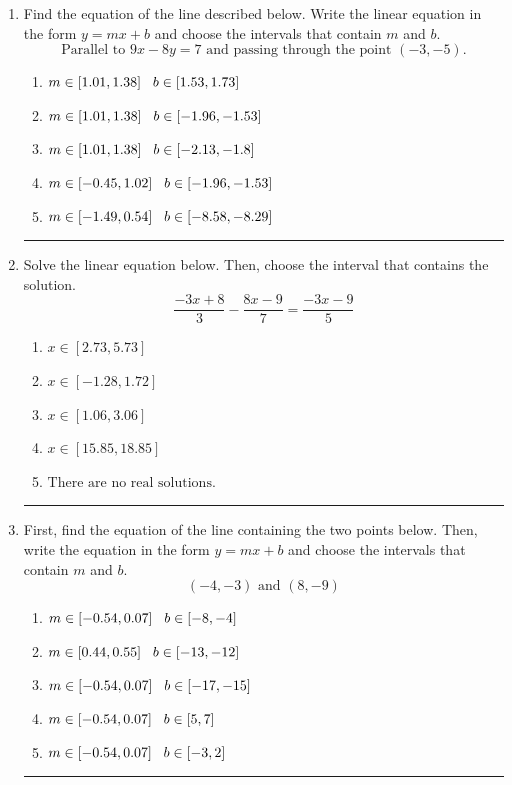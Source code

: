 \documentclass[14pt]{extbook}
\newcommand{\litem}[1]{\item#1\hspace*{-1cm}\rule{\textwidth}{0.4pt}}
\begin{document}
\begin{enumerate}
{\begin{enumerate}[label=\Alph*.]
\end{enumerate} }
\litem{
Find the equation of the line described below. Write the linear equation in the form $ y=mx+b $ and choose the intervals that contain $m$ and $b$.\[ \text{Parallel to } 9 x - 8 y = 7 \text{ and passing through the point } (-3, -5). \]\begin{enumerate}[label=\Alph*.]
\item \( m \in [1.01, 1.38] \hspace*{3mm} b \in [1.53, 1.73] \)
\item \( m \in [1.01, 1.38] \hspace*{3mm} b \in [-1.96, -1.53] \)
\item \( m \in [1.01, 1.38] \hspace*{3mm} b \in [-2.13, -1.8] \)
\item \( m \in [-0.45, 1.02] \hspace*{3mm} b \in [-1.96, -1.53] \)
\item \( m \in [-1.49, 0.54] \hspace*{3mm} b \in [-8.58, -8.29] \)

\end{enumerate} }
\litem{
Solve the linear equation below. Then, choose the interval that contains the solution.\[ \frac{-3x + 8}{3} - \frac{8x -9}{7} = \frac{-3x -9}{5} \]\begin{enumerate}[label=\Alph*.]
\item \( x \in [2.73, 5.73] \)
\item \( x \in [-1.28, 1.72] \)
\item \( x \in [1.06, 3.06] \)
\item \( x \in [15.85, 18.85] \)
\item \( \text{There are no real solutions.} \)

\end{enumerate} }
\litem{
First, find the equation of the line containing the two points below. Then, write the equation in the form $ y=mx+b $ and choose the intervals that contain $m$ and $b$.\[ (-4, -3) \text{ and } (8, -9) \]\begin{enumerate}[label=\Alph*.]
\item \( m \in [-0.54, 0.07] \hspace*{3mm} b \in [-8, -4] \)
\item \( m \in [0.44, 0.55] \hspace*{3mm} b \in [-13, -12] \)
\item \( m \in [-0.54, 0.07] \hspace*{3mm} b \in [-17, -15] \)
\item \( m \in [-0.54, 0.07] \hspace*{3mm} b \in [5, 7] \)
\item \( m \in [-0.54, 0.07] \hspace*{3mm} b \in [-3, 2] \)


\end{enumerate}}
\end{enumerate}
\end{document}
